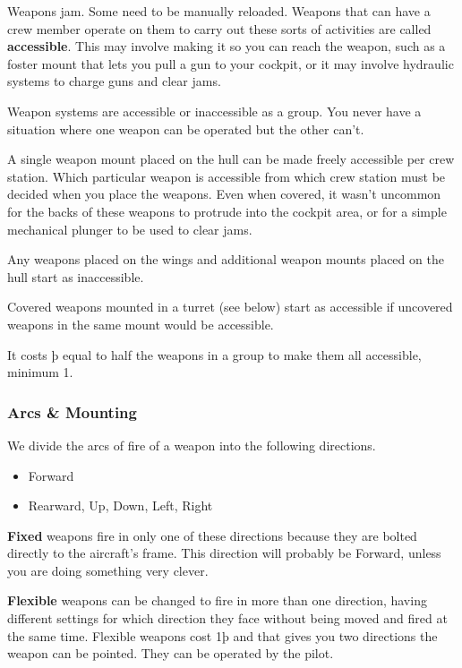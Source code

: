 \documentclass{article}
\begin{document}
\hfill\break
Weapons jam. Some need to be manually reloaded. Weapons that can have a
crew member operate on them to carry out these sorts of activities are
called \textbf{accessible}. This may involve making it so you can reach
the weapon, such as a foster mount that lets you pull a gun to your
cockpit, or it may involve hydraulic systems to charge guns and clear
jams.

Weapon systems are accessible or inaccessible as a group. You never have
a situation where one weapon can be operated but the other can't.

A single weapon mount placed on the hull can be made freely accessible
per crew station. Which particular weapon is accessible from which crew
station must be decided when you place the weapons. Even when covered,
it wasn't uncommon for the backs of these weapons to protrude into the
cockpit area, or for a simple mechanical plunger to be used to clear
jams.

Any weapons placed on the wings and additional weapon mounts placed on
the hull start as inaccessible.

Covered weapons mounted in a turret (see below) start as accessible if
uncovered weapons in the same mount would be accessible.

It costs þ equal to half the weapons in a group to make them all
accessible, minimum 1.

\subsubsection{Arcs \& Mounting}
\label{_Arcs_\&_Mounting}

We divide the arcs of fire of a weapon into the following directions.

\begin{itemize}
    \item Forward
    \item Rearward, Up, Down, Left, Right
\end{itemize}

\textbf{Fixed}{ weapons fire in only one of these
    directions because they are bolted directly to the aircraft's frame.
    This direction will probably be Forward, unless you are doing something
    very clever.}

\textbf{Flexible }{weapons can be changed to fire in more
    than one direction, having different settings for which direction they
    face without being moved and fired at the same time. Flexible weapons
    cost 1þ and that gives you two directions the weapon can be pointed.
    They can be operated by the pilot.}
\end{document}
